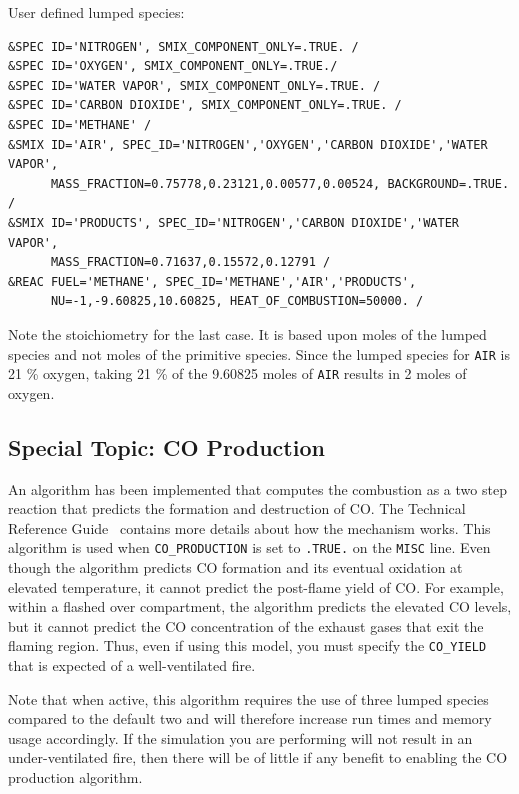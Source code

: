 \documentclass[11pt]{book}
\newcommand{\ct}{\tt\small}
\begin{document}
User defined lumped species:

\footnotesize
\begin{verbatim}
&SPEC ID='NITROGEN', SMIX_COMPONENT_ONLY=.TRUE. /
&SPEC ID='OXYGEN', SMIX_COMPONENT_ONLY=.TRUE./
&SPEC ID='WATER VAPOR', SMIX_COMPONENT_ONLY=.TRUE. /
&SPEC ID='CARBON DIOXIDE', SMIX_COMPONENT_ONLY=.TRUE. /
&SPEC ID='METHANE' /
&SMIX ID='AIR', SPEC_ID='NITROGEN','OXYGEN','CARBON DIOXIDE','WATER VAPOR',
      MASS_FRACTION=0.75778,0.23121,0.00577,0.00524, BACKGROUND=.TRUE. /
&SMIX ID='PRODUCTS', SPEC_ID='NITROGEN','CARBON DIOXIDE','WATER VAPOR',
      MASS_FRACTION=0.71637,0.15572,0.12791 /
&REAC FUEL='METHANE', SPEC_ID='METHANE','AIR','PRODUCTS',
      NU=-1,-9.60825,10.60825, HEAT_OF_COMBUSTION=50000. /
\end{verbatim} \normalsize

\noindent
Note the stoichiometry for the last case.  It is based upon moles of the lumped species and not moles of the primitive species.
Since the lumped species for {\ct AIR} is 21 \% oxygen, taking 21 \% of the 9.60825 moles of {\ct AIR} results in 2 moles of oxygen.


\subsection{Special Topic: CO Production}

\label{info:CO}

An algorithm has been implemented that computes the combustion as a two step reaction that
predicts the formation and destruction of CO.  The Technical Reference Guide~\cite{FDS_Math_Guide}
contains more details about how the mechanism works. This algorithm is used when
{\ct CO\_PRODUCTION} is set to {\ct .TRUE.} on the {\ct MISC} line. Even though the algorithm predicts
CO formation and its eventual oxidation at elevated temperature, it cannot predict the post-flame
yield of CO. For example, within a flashed over compartment, the algorithm predicts the elevated
CO levels, but it cannot predict the CO concentration of the exhaust gases that exit the flaming region.
Thus, even if using this model, you must specify the {\ct CO\_YIELD} that is expected of a well-ventilated fire.

\begin{warning}
\noindent
Note that when active, this algorithm requires the use of three lumped species compared to the default two and will therefore
increase run times and memory usage accordingly.  If the simulation you are
performing will not result in an under-ventilated fire, then there will be of
little if any benefit to enabling the CO production algorithm.
\end{warning}
\end{document}
